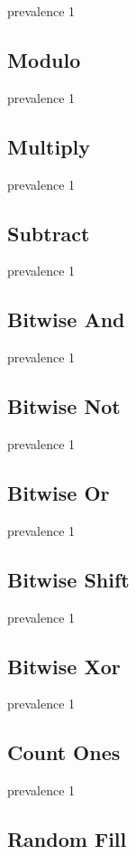 prevalence 1

\subsection{Modulo}

prevalence 1

\subsection{Multiply}

prevalence 1

\subsection{Subtract}

prevalence 1

\subsection{Bitwise And}

prevalence 1

\subsection{Bitwise Not}

prevalence 1

\subsection{Bitwise Or}

prevalence 1

\subsection{Bitwise Shift}

prevalence 1

\subsection{Bitwise Xor}

prevalence 1

\subsection{Count Ones}

prevalence 1

\subsection{Random Fill}

